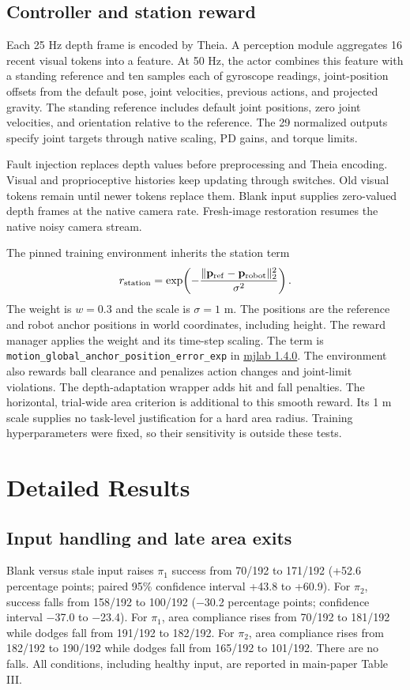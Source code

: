 \subsection{Controller and station reward}
Each 25 Hz depth frame is encoded by Theia. A perception module aggregates
16 recent visual tokens into a feature. At 50 Hz, the actor combines this
feature with a standing reference and ten samples each of gyroscope readings,
joint-position offsets from the default pose, joint velocities, previous
actions, and projected gravity. The standing reference includes default joint
positions, zero joint velocities, and orientation relative to the reference.
The 29 normalized outputs specify joint targets through native scaling,
PD gains, and torque limits.

Fault injection replaces depth values before preprocessing and Theia encoding.
Visual and proprioceptive histories keep updating through switches. Old visual
tokens remain until newer tokens replace them. Blank input supplies zero-valued
depth frames at the native camera rate. Fresh-image restoration resumes the
native noisy camera stream.

The pinned training environment inherits the station term
\begin{equation}
r_{\rm station}=\exp\!\left(-\frac{\|\mathbf p_{\rm ref}
-\mathbf p_{\rm robot}\|_2^2}{\sigma^2}\right).
\end{equation}
The weight is $w=0.3$ and the scale is $\sigma=1$ m. The positions are the
reference and robot anchor positions in world coordinates, including height.
The reward manager applies the weight and its time-step scaling. The term is
\texttt{motion\_global\_anchor\_position\_error\_exp} in
\href{https://github.com/mujocolab/mjlab/blob/v1.4.0/src/mjlab/tasks/tracking/mdp/rewards.py}{mjlab 1.4.0}.
The environment also rewards ball clearance and penalizes action changes and
joint-limit violations. The depth-adaptation wrapper adds hit and fall
penalties. The horizontal, trial-wide area criterion is additional to this
smooth reward. Its 1 m scale supplies no task-level justification for a hard
area radius. Training hyperparameters were fixed, so their sensitivity is
outside these tests.

\section{Detailed Results}
\label{app:results}
\subsection{Input handling and late area exits}
Blank versus stale input raises $\pi_1$ success from 70/192 to 171/192
(+52.6 percentage points; paired 95\% confidence interval +43.8 to +60.9).
For $\pi_2$, success falls from 158/192 to 100/192 ($-$30.2 percentage points;
confidence interval $-$37.0 to $-$23.4). For $\pi_1$, area compliance rises
from 70/192 to 181/192 while dodges fall from 191/192 to 182/192. For $\pi_2$,
area compliance rises from 182/192 to 190/192 while dodges fall from 165/192 to
101/192. There are no falls. All conditions, including healthy input, are
reported in main-paper Table III.

